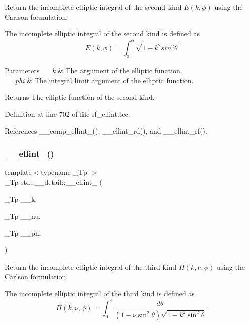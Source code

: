 Return the incomplete elliptic integral of the second kind $ E(k,\phi) $ using the Carlson formulation. 

The incomplete elliptic integral of the second kind is defined as \[ E(k,\phi) = \int_0^{\phi} \sqrt{1 - k^2 sin^2\theta} \]


\begin{DoxyParams}{Parameters}
{\em \+\_\+\+\_\+k} & The argument of the elliptic function. \\
\hline
{\em \+\_\+\+\_\+phi} & The integral limit argument of the elliptic function. \\
\hline
\end{DoxyParams}
\begin{DoxyReturn}{Returns}
The elliptic function of the second kind. 
\end{DoxyReturn}


Definition at line 702 of file sf\+\_\+ellint.\+tcc.



References \+\_\+\+\_\+comp\+\_\+ellint\+\_(), \+\_\+\+\_\+ellint\+\_\+rd(), and \+\_\+\+\_\+ellint\+\_\+rf().

\mbox{\label{namespacestd_1_1____detail_a9c6ea96cd5d6907fce278010b992499a}} 
\subsubsection{\texorpdfstring{\+\_\+\+\_\+ellint\+\_()}{\_\_ellint\_3()}}
{\footnotesize\ttfamily template$<$typename \+\_\+\+Tp $>$ \\
\+\_\+\+Tp std\+::\+\_\+\+\_\+detail\+::\+\_\+\+\_\+ellint\+\_ (\begin{DoxyParamCaption}\item[{\+\_\+\+Tp}]{\+\_\+\+\_\+k,  }\item[{\+\_\+\+Tp}]{\+\_\+\+\_\+nu,  }\item[{\+\_\+\+Tp}]{\+\_\+\+\_\+phi }\end{DoxyParamCaption})}



Return the incomplete elliptic integral of the third kind $ \Pi(k,\nu,\phi) $ using the Carlson formulation. 

The incomplete elliptic integral of the third kind is defined as \[ \Pi(k,\nu,\phi) = \int_0^{\phi} \frac{d\theta} {(1 - \nu \sin^2\theta) \sqrt{1 - k^2 \sin^2\theta}} \]


